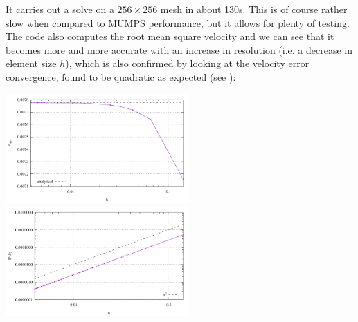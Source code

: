 It carries out a solve on a $256\times 256$ mesh in about 130s. This is of course rather slow when compared to 
MUMPS performance, but it allows for plenty of testing.
The code also computes the root mean square velocity and we can see that it becomes more and more accurate with 
an increase in resolution (i.e. a decrease in element size $h$), which is also confirmed by looking at the 
velocity error convergence, found to be quadratic as expected (see ):

\begin{center}
\includegraphics[width=7cm]{python_codes/fieldstone_101/results/vrms.pdf}
\includegraphics[width=7cm]{python_codes/fieldstone_101/results/errv.pdf}
\end{center}


